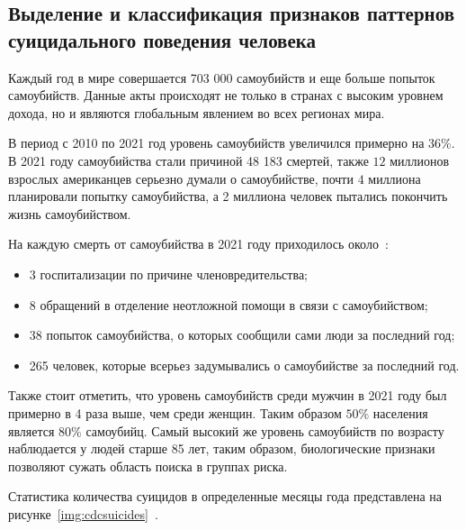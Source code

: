 \subsection{Выделение и классификация признаков паттернов суицидального поведения человека}

Каждый год в мире совершается 703 000 самоубийств и еще больше попыток самоубийств. Данные акты происходят не только в странах с высоким уровнем дохода, но и являются глобальным явлением во всех регионах мира.~\cite{suicideVOZDouble}

В период с 2010 по 2021 год уровень самоубийств увеличился примерно на $36\%$. 
В 2021 году самоубийства стали причиной 48 183 смертей, также $12$ миллионов взрослых американцев серьезно думали о самоубийстве, почти $4$ миллиона планировали попытку самоубийства, а 2 миллиона человек пытались покончить жизнь самоубийством.~\cite{suicideStats}

На каждую смерть от самоубийства в 2021 году приходилось около~\cite{suicideStats}:
\begin{itemize}
	\item 3 госпитализации по причине членовредительства;
	\item 8 обращений в отделение неотложной помощи в связи с самоубийством;
	\item 38 попыток самоубийства, о которых сообщили сами люди за последний год;
	\item 265 человек, которые всерьез задумывались о самоубийстве за последний год. 
\end{itemize}

Также стоит отметить, что уровень самоубийств среди мужчин в 2021 году был примерно в 4 раза выше, чем среди женщин. 
Таким образом $50\%$ населения является $80\%$ самоубийц. 
Самый высокий же уровень самоубийств по возрасту наблюдается у людей старше 85 лет, таким образом, биологические признаки позволяют сужать область поиска в группах риска.

Статистика количества суицидов в определенные месяцы года представлена на рисунке~\ref{img:cdcsuicides}~\cite{suicideStats}.

